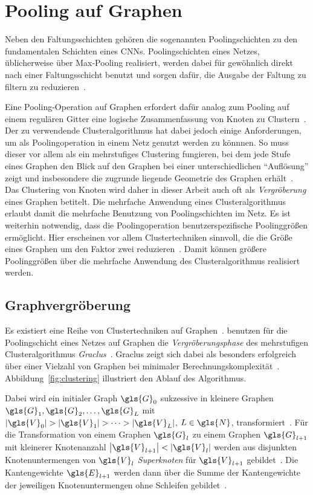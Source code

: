 \section{Pooling auf Graphen}
\label{pooling}

Neben den Faltungsschichten gehören die sogenannten Poolingschichten zu den fundamentalen Schichten eines \glspl{CNN}.
Poolingschichten eines Netzes, üblicherweise über Max-Pooling realisiert, werden dabei für gewöhnlich direkt nach einer Faltungsschicht benutzt und sorgen dafür, die Ausgabe der Faltung zu filtern \bzw{} zu reduzieren~\cite{Nielsen}.

Eine Pooling-Operation auf Graphen erfordert dafür analog zum Pooling auf einem regulären Gitter eine logische Zusammenfassung von Knoten zu Clustern~\cite{Defferrard}.
Der zu verwendende Clusteralgorithmus hat dabei jedoch einige Anforderungen, um als Poolingoperation in einem Netz genutzt werden zu könnnen.
So muss dieser vor allem als ein mehrstufiges Clustering fungieren, bei dem jede Stufe eines Graphen den Blick auf den Graphen bei einer unterschiedlichen \enquote{Auflösung} zeigt und insbesondere die zugrunde liegende Geometrie des Graphen erhält~\cite{Defferrard}.
Das Clustering von Knoten wird daher in dieser Arbeit auch oft als \emph{Vergröberung} eines Graphen betitelt.
Die mehrfache Anwendung eines Clusteralgorithmus erlaubt damit die mehrfache Benutzung von Poolingschichten im Netz.
Es ist weiterhin notwendig, dass die Poolingoperation benutzerspezifische Poolinggrößen ermöglicht.
Hier erscheinen vor allem Clustertechniken sinnvoll, die die Größe eines Graphen um den Faktor zwei reduzieren~\cite{Defferrard}.
Damit können größere Poolinggrößen über die mehrfache Anwendung des Clusteralgorithmus realisiert werden.

\subsection{Graphvergröberung}
\label{graphvergroeberung}

Es existiert eine Reihe von Clustertechniken auf Graphen~\cite{Luxburg, graclus, Defferrard}.
\citeauthor{Defferrard} benutzen für die Poolingschicht eines Netzes auf Graphen die \emph{Vergröberungsphase} des mehrstufigen Clusteralgorithmus \emph{Graclus}~\cite{graclus}.
Graclus zeigt sich dabei als besonders erfolgreich über einer Vielzahl von Graphen bei minimaler Berechnungskomplexität~\cite{Defferrard}.
Abbildung~\ref{fig:clustering} illustriert den Ablauf des Algorithmus.

Dabei wird ein initialer Graph $\gls{G}_0$ sukzessive in kleinere Graphen $\gls{G}_1, \gls{G}_2, \ldots, \gls{G}_L$ mit $\left|\gls{V}_0\right| > \left|\gls{V}_1\right| > \cdots > |\gls{V}_L|$, $L \in \gls{N}$, transformiert~\cite{graclus}.
Für die Transformation von einem Graphen $\gls{G}_l$ zu einem Graphen $\gls{G}_{l+1}$ mit kleinerer Knotenanzahl $\left|\gls{V}_{l+1}\right| < \left|\gls{V}_l\right|$ werden aus disjunkten Knotenuntermengen von $\gls{V}_l$ \emph{Superknoten} für $\gls{V}_{l+1}$ gebildet~\cite{graclus}.
Die Kantengewichte $\gls{E}_{l+1}$ werden dann über die Summe der Kantengewichte der jeweiligen Knotenuntermengen ohne Schleifen gebildet~\cite{graclus}.

